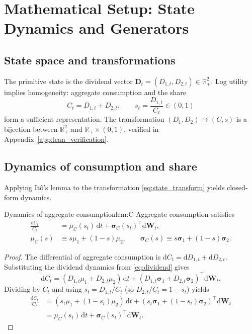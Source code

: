﻿\documentclass[11pt,letterpaper,oneside]{article}
\numberwithin{equation}{section}
\newcommand{\R}{\mathbb{R}}
\newcommand{\1}{\mathbf{1}}
\newcommand{\diff}{\mathrm{d}}
\begin{document}
\section{Mathematical Setup: State Dynamics and Generators}
\subsection{State space and transformations}
The primitive state is the dividend vector $\bm{D}_t=(D_{1,t},D_{2,t})\in\R_+^2$. Log utility implies homogeneity: aggregate consumption and the share
\begin{equation}\label{eq:state_transform}
  C_t=D_{1,t}+D_{2,t}, \qquad s_t=\frac{D_{1,t}}{C_t}\in(0,1)
\end{equation}
form a sufficient representation. The transformation $(D_1,D_2)\mapsto(C,s)$ is a bijection between $\R_+^2$ and $\R_+\times(0,1)$, verified in Appendix~\ref{app:lean_verification}.

\subsection{Dynamics of consumption and share}
Applying It\^o's lemma to the transformation \eqref{eq:state_transform} yields closed-form dynamics.

\begin{lemma}{Dynamics of aggregate consumption}{lem:C}
Aggregate consumption satisfies
\begin{align}
  \frac{\diff C_t}{C_t}
  &= \mu_C(s_t)\,\diff t + \bm{\sigma}_C(s_t)^{\top}\diff \bm{W}_t,
  \label{eq:C_drift}\\
  \mu_C(s) &\equiv s\mu_1+(1-s)\mu_2,
  \qquad
  \bm{\sigma}_C(s) \equiv s\bm{\sigma}_1+(1-s)\bm{\sigma}_2.
  \label{eq:sigmaC_def}
\end{align}
\end{lemma}
\begin{proof}
The differential of aggregate consumption is \mbox{$\diff C_t = \diff D_{1,t}+\diff D_{2,t}$}. Substituting the dividend dynamics from \cref{eq:dividend} gives
\[
  \diff C_t = (D_{1,t}\mu_1+D_{2,t}\mu_2)\,\diff t + (D_{1,t}\bm{\sigma}_1+D_{2,t}\bm{\sigma}_2)^{\top}\diff\bm{W}_t.
\]
Dividing by $C_t$ and using $s_t=D_{1,t}/C_t$ (so $D_{2,t}/C_t=1-s_t$) yields
\begin{align*}
  \frac{\diff C_t}{C_t}
  &= (s_t\mu_1+(1-s_t)\mu_2)\,\diff t + (s_t\bm{\sigma}_1+(1-s_t)\bm{\sigma}_2)^{\top}\diff\bm{W}_t \\
  &= \mu_C(s_t)\,\diff t + \bm{\sigma}_C(s_t)^{\top}\diff\bm{W}_t.
\end{align*}
\end{proof}
\end{document}
